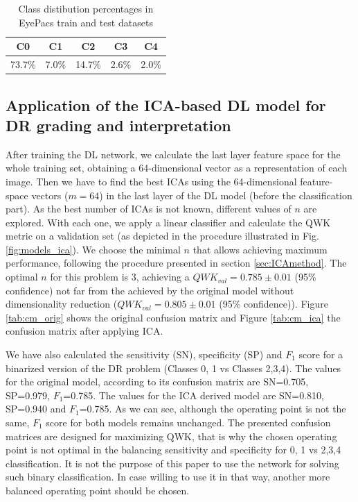 \documentclass[review]{elsarticle}
\theoremstyle{definition} %
\theoremstyle{remark}
\begin{document}
\begin{table}[ht!]
	\centering
	\begin{tabular}{c c c c c } 
		\hline
		 C0 & C1 & C2 & C3 & C4 \\ [0.5ex] 
		\hline\hline
		 73.7\% & 7.0\% & 14.7\% & 2.6\% & 2.0\%\\
		\hline
	\end{tabular}
	\caption{Class distibution percentages in EyePacs train and test datasets}
	\label{class:tab:classperc}
\end{table}

\subsection{Application of the ICA-based DL model for DR grading and interpretation}

After training the DL network, we calculate the last layer feature space for the whole training set, obtaining a 64-dimensional vector as a representation of each image.
Then we have to find the best ICAs using the 64-dimensional feature-space vectors ($m=64$) in the last layer of the DL model (before the classification part). As the best number of ICAs is not known, different values of $n$ are explored. With each one, we apply a linear classifier and calculate the QWK metric on a validation set (as depicted in the procedure illustrated in Fig. \ref{fig:models_ica}). We choose the minimal $n$ that allows achieving maximum performance, following the procedure presented in section \ref{sec:ICAmethod}. The optimal $n$ for this problem is $3$, achieving a $QWK_{val} = 0.785 \pm 0.01$ (95\% confidence) not far from the achieved by the original model without dimensionality reduction ($QWK_{val} = 0.805 \pm 0.01$ (95\% confidence)). 
 Figure \ref{tab:cm_orig} shows the original confusion matrix and Figure \ref{tab:cm_ica} the confusion matrix after applying ICA. 




We have also calculated the sensitivity (SN), specificity (SP) and $F_1$ score for a binarized version of the DR problem (Classes 0, 1 vs Classes 2,3,4). The values for the original model, according to its confusion matrix are SN=0.705, SP=0.979, $F_1$=0.785. The values for the ICA derived model are SN=0.810, SP=0.940 and $F_1$=0.785. As we can see, although the operating point is not the same, $F_1$ score for both models remains unchanged. The presented confusion matrices are designed for maximizing QWK, that is why the chosen operating point is not optimal in the balancing sensitivity and specificity for 0, 1 vs 2,3,4 classification. It is not the purpose of this paper to use the network for solving such binary classification. In case willing to use it in that way, another more balanced operating point should be chosen.
\end{document}
